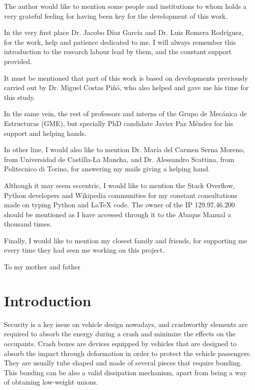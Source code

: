 \documentclass[
documentsize = a4, %
font = cmr, %
typesize = 11, %
printmode = true,
onehalfspacing = true,
language = en, %
titlepage = udciccp, %
degree = pt, %
dedication = true,
acknowledgements = true,
abstract-en = true,
abstract-es = false,
abstract-ga = false,
epigraphs = true,
toc = true,
lof = true,
lot = true,
frontmatterintoc = false,
notation = false,
minimal = false,
]{UDCthesis}
\begin{document}


\begin{acknowledgements}
The author would like to mention some people and institutions to whom holds a very grateful feeling for having been key for the development of this work.

In the very first place Dr. Jacobo Díaz García and Dr. Luis Romera Rodríguez, for the work, help and patience dedicated to me. I will always remember this introduction to the research labour lead by them, and the constant support provided.

It must be mentioned that part of this work is based on developments previously carried out by Dr. Miguel Costas Piñó, who also helped and gave me his time for this study.

In the same vein, the rest of professors and interns of the Grupo de Mecánica de Estructuras (GME), but specially PhD candidate Javier Paz Méndez for his support and helping hands.

In other line, I would also like to mention Dr. María del Carmen Serna Moreno, from Universidad de Castilla-La Mancha, and Dr. Alessandro Scattina, from Politecnico di Torino, for answering my mails giving a helping hand.

Although it may seem eccentric, I would like to mention the Stack Overflow, Python developers and Wikipedia communities for my constant consultations made on typing Python and \LaTeX{} code. The owner of the IP 129.97.46.200 should be mentioned as I have accessed through it to the Abaqus Manual a thousand times.

Finally, I would like to mention my closest family and friends, for supporting me every time they had seen me working on this project.
\end{acknowledgements}

\begin{dedication}
To my mother and father
\end{dedication}

\chapter{Introduction}
\label{0}

Security is a key issue on vehicle design nowadays, and crashworthy elements are required to absorb the energy during a crash and minimize the effects on the occupants. Crash boxes are devices equipped by vehicles that are designed to absorb the impact through deformation in order to protect the vehicle passengers. They are usually tube shaped and made of several pieces that require bonding. This bonding can be also a valid dissipation mechanism, apart from being a way of obtaining low-weight unions.
\end{document}
